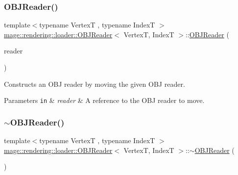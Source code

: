 \subsubsection{\texorpdfstring{O\+B\+J\+Reader()}{OBJReader()}\hspace{0.1cm}{\footnotesize\ttfamily [3/3]}}
{\footnotesize\ttfamily template$<$typename VertexT , typename IndexT $>$ \\
\mbox{\hyperlink{classmage_1_1rendering_1_1loader_1_1_o_b_j_reader}{mage\+::rendering\+::loader\+::\+O\+B\+J\+Reader}}$<$ VertexT, IndexT $>$\+::\mbox{\hyperlink{classmage_1_1rendering_1_1loader_1_1_o_b_j_reader}{O\+B\+J\+Reader}} (\begin{DoxyParamCaption}\item[{\mbox{\hyperlink{classmage_1_1rendering_1_1loader_1_1_o_b_j_reader}{O\+B\+J\+Reader}}$<$ VertexT, IndexT $>$ \&\&}]{reader }\end{DoxyParamCaption})\hspace{0.3cm}{\ttfamily [noexcept]}}

Constructs an O\+BJ reader by moving the given O\+BJ reader.


\begin{DoxyParams}[1]{Parameters}
\mbox{\tt in}  & {\em reader} & A reference to the O\+BJ reader to move. \\
\hline
\end{DoxyParams}
\mbox{\label{classmage_1_1rendering_1_1loader_1_1_o_b_j_reader_a2b10c4cbb4c4aea192c78045beb4735e}} 
\subsubsection{\texorpdfstring{$\sim$\+O\+B\+J\+Reader()}{~OBJReader()}}
{\footnotesize\ttfamily template$<$typename VertexT , typename IndexT $>$ \\
\mbox{\hyperlink{classmage_1_1rendering_1_1loader_1_1_o_b_j_reader}{mage\+::rendering\+::loader\+::\+O\+B\+J\+Reader}}$<$ VertexT, IndexT $>$\+::$\sim$\mbox{\hyperlink{classmage_1_1rendering_1_1loader_1_1_o_b_j_reader}{O\+B\+J\+Reader}} (\begin{DoxyParamCaption}{ }\end{DoxyParamCaption})}

